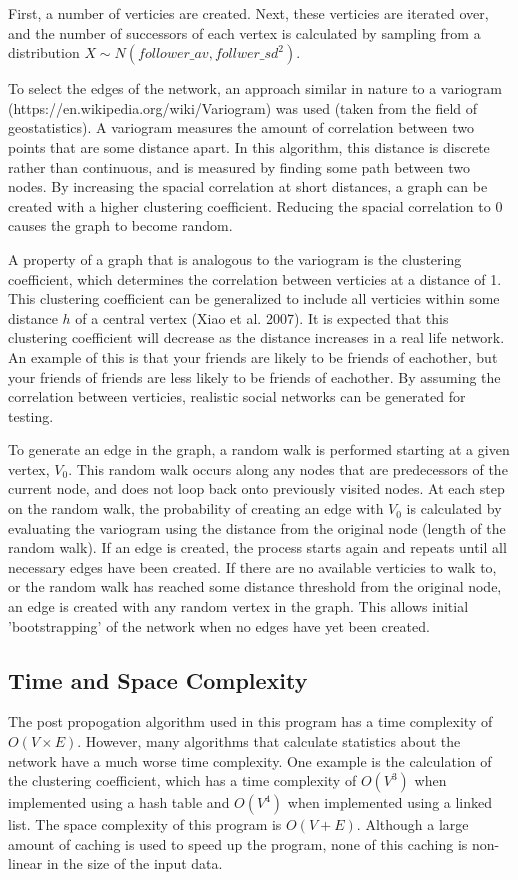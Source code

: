 \documentclass{article}
\begin{document}
First, a number of verticies are created.
Next, these verticies are iterated over, and the number of successors of each
vertex is calculated by sampling from a distribution $X \sim N\left(follower\_av, follwer\_sd^2\right)$.

To select the edges of the network, an approach similar in nature to a variogram
(https://en.wikipedia.org/wiki/Variogram) was used (taken from the field of geostatistics).
A variogram measures the amount of correlation between two points that are some distance apart.
In this algorithm, this distance is discrete rather than continuous, and is measured by finding
some path between two nodes. By increasing the spacial correlation at short distances,
a graph can be created with a higher clustering coefficient. Reducing the spacial correlation
to 0 causes the graph to become random.

A property of a graph that is analogous to the variogram is the clustering
coefficient, which determines the correlation between verticies at a distance of 1.
This clustering coefficient can be generalized to include all verticies
within some distance $h$ of a central vertex (Xiao et al. 2007).
It is expected that this clustering coefficient will decrease as the distance increases
in a real life network. An example of this is that your friends are likely to be friends of
eachother, but your friends of friends are less likely to be friends of eachother.
By assuming the correlation between verticies, realistic social networks can be generated
for testing.

To generate an edge in the graph, a random walk is performed starting at a given vertex, $V_0$.
This random walk occurs along any nodes that are predecessors of the current node,
and does not loop back onto previously visited nodes.
At each step on the random walk, the probability of creating an edge with $V_0$
is calculated by evaluating the variogram using the distance from the original node
(length of the random walk).
If an edge is created, the process
starts again and repeats until all necessary edges have been created.
If there are no available verticies to walk to,
or the random walk has reached some distance threshold from the original node,
an edge is created with any random vertex in the graph. This allows initial
'bootstrapping' of the network when no edges have yet been created.

\subsection{Time and Space Complexity}
The post propogation algorithm used in this program has a time complexity of
$O\left(V \times E\right)$. However, many algorithms that calculate statistics about the network have a much
worse time complexity. One example is the calculation of the clustering coefficient,
which has a time complexity of $O\left(V^3\right)$ when implemented using a hash table
and $O\left(V^4\right)$ when implemented using a linked list.
The space complexity of this program is $O\left(V + E\right)$. Although
a large amount of caching is used to speed up the program, none of this caching
is non-linear in the size of the input data.
\end{document}
